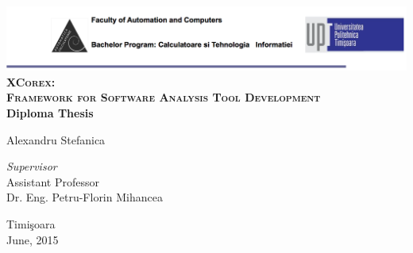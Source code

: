 \begin{titlepage}
	\begin{center}	
		\includegraphics[width=\textwidth]{../img/header.png}\\[4cm]
		
		{\huge \bfseries \textsc{XCorex:\vspace{5mm}\\ Framework for
Software\vspace{5mm} Analysis Tool Development\vspace{\fill}}}
		\\[3cm]
		
		{\bfseries Diploma Thesis} \\[3cm]
						
				
		\begin{flushright}
				\large Alexandru Stefanica \\[1cm]
		\end{flushright}
		\begin{flushleft}
			 \large
				\emph{Supervisor} \\
				Assistant Professor \\
				Dr. Eng. Petru-Florin Mihancea \\[1cm]
		\end{flushleft}
		
		\vfill
		{\large {Timi\c{s}oara \\June, 2015}}
	\end{center}
\end{titlepage}
